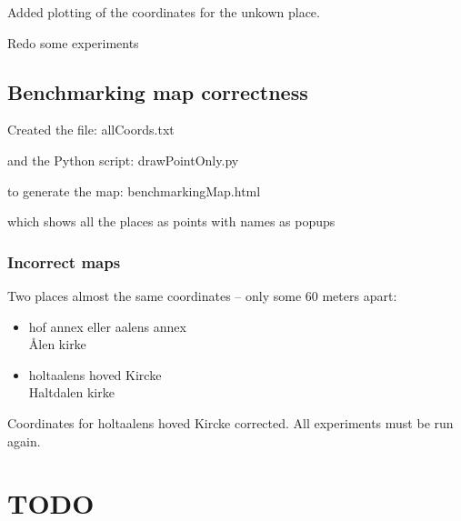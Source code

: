 \documentclass[12pt]{book}
\begin{document}
Added plotting of the coordinates for the unkown place.

Redo some experiments

\subsection{Benchmarking map correctness}

Created the file: allCoords.txt 

and the Python script: drawPointOnly.py

to generate the map: benchmarkingMap.html

which shows all the places as points with names as popups

\subsubsection{Incorrect maps}

Two places almost the same coordinates -- only some 60 meters apart:

\begin{itemize}
\item hof annex eller aalens annex \\
Ålen kirke
\item holtaalens hoved Kircke \\
Haltdalen kirke
\end{itemize}

Coordinates for holtaalens hoved Kircke corrected. All experiments must be run again. 


\section{TODO}




\end{document}

